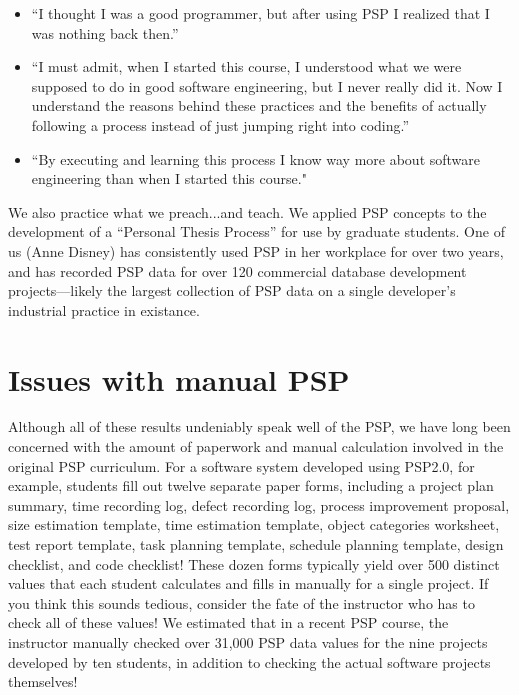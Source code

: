 \begin{itemize}
\item ``I thought I was a good programmer, but after using PSP I realized
      that I was nothing back then.''
\item ``I must admit, when I started this course, I understood what we were
        supposed to do in good software engineering, but I never really did
        it.  Now I understand the reasons behind these practices and the
        benefits of actually following a process instead of just jumping
        right into coding.''
\item ``By executing and learning this process
       I know way more about software engineering than when I
       started this course."
\end{itemize}

We also practice what we preach...and teach.  We applied PSP concepts to
the development of a ``Personal Thesis Process'' for use by graduate
students.  One of us (Anne Disney) has consistently used PSP in her
workplace for over two years, and has recorded PSP data for over 120
commercial database development projects---likely the largest
collection of PSP data on a single developer's industrial practice in
existance.


\section{Issues with manual PSP}

Although all of these results undeniably speak well of the PSP, we have
long been concerned with the amount of paperwork and manual calculation
involved in the original PSP curriculum.  For a software system developed
using PSP2.0, for example, students fill out twelve separate paper forms,
including a project plan summary, time recording log, defect recording log,
process improvement proposal, size estimation template, time estimation
template, object categories worksheet, test report template, task planning
template, schedule planning template, design checklist, and code checklist!
These dozen forms typically yield over 500 distinct values that each
student calculates and fills in manually for a single project.  If you
think this sounds tedious, consider the fate of the instructor who has to
check all of these values!  We estimated that in a recent PSP course, the
instructor manually checked over 31,000 PSP data values for the nine
projects developed by ten students, in addition to checking the actual
software projects themselves! 

